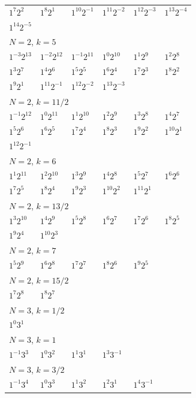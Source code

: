 \documentclass[12pt]{amsart}
\numberwithin{equation}{section}
\theoremstyle{plain}
\theoremstyle{definition}
\theoremstyle{remark}
\begin{document}
\begin{longtable}{llllll}
$1^{7}2^{2}$ & $1^{8}2^{1}$ & $1^{10}2^{-1}$ & $1^{11}2^{-2}$ & $1^{12}2^{-3}$ & $1^{13}2^{-4}$\\
$1^{14}2^{-5}$ & &&&&\\
\midrule
\multicolumn{6}{l}{$N=2$, $k=5$}\\
$1^{-3}2^{13}$ & $1^{-2}2^{12}$ & $1^{-1}2^{11}$ & $1^{0}2^{10}$ & $1^{1}2^{9}$ & $1^{2}2^{8}$\\
$1^{3}2^{7}$ & $1^{4}2^{6}$ & $1^{5}2^{5}$ & $1^{6}2^{4}$ & $1^{7}2^{3}$ & $1^{8}2^{2}$\\
$1^{9}2^{1}$ & $1^{11}2^{-1}$ & $1^{12}2^{-2}$ & $1^{13}2^{-3}$ & &\\
\midrule
\multicolumn{6}{l}{$N=2$, $k=11/2$}\\
$1^{-1}2^{12}$ & $1^{0}2^{11}$ & $1^{1}2^{10}$ & $1^{2}2^{9}$ & $1^{3}2^{8}$ & $1^{4}2^{7}$\\
$1^{5}2^{6}$ & $1^{6}2^{5}$ & $1^{7}2^{4}$ & $1^{8}2^{3}$ & $1^{9}2^{2}$ & $1^{10}2^{1}$\\
$1^{12}2^{-1}$ & &&&&\\
\midrule
\multicolumn{6}{l}{$N=2$, $k=6$}\\
$1^{1}2^{11}$ & $1^{2}2^{10}$ & $1^{3}2^{9}$ & $1^{4}2^{8}$ & $1^{5}2^{7}$ & $1^{6}2^{6}$\\
$1^{7}2^{5}$ & $1^{8}2^{4}$ & $1^{9}2^{3}$ & $1^{10}2^{2}$ & $1^{11}2^{1}$ & \\
\midrule
\multicolumn{6}{l}{$N=2$, $k=13/2$}\\
$1^{3}2^{10}$ & $1^{4}2^{9}$ & $1^{5}2^{8}$ & $1^{6}2^{7}$ & $1^{7}2^{6}$ & $1^{8}2^{5}$\\
$1^{9}2^{4}$ & $1^{10}2^{3}$ & &&&\\
\midrule
\multicolumn{6}{l}{$N=2$, $k=7$}\\
$1^{5}2^{9}$ & $1^{6}2^{8}$ & $1^{7}2^{7}$ & $1^{8}2^{6}$ & $1^{9}2^{5}$ & \\
\midrule
\multicolumn{6}{l}{$N=2$, $k=15/2$}\\
$1^{7}2^{8}$ & $1^{8}2^{7}$ & &&&\\
\midrule
\multicolumn{6}{l}{$N=3$, $k=1/2$}\\
$1^{0}3^{1}$ & &&&&\\
\midrule
\multicolumn{6}{l}{$N=3$, $k=1$}\\
$1^{-1}3^{3}$ & $1^{0}3^{2}$ & $1^{1}3^{1}$ & $1^{3}3^{-1}$ & &\\
\midrule
\multicolumn{6}{l}{$N=3$, $k=3/2$}\\
$1^{-1}3^{4}$ & $1^{0}3^{3}$ & $1^{1}3^{2}$ & $1^{2}3^{1}$ & $1^{4}3^{-1}$ & \\

\end{longtable}
\end{document}
